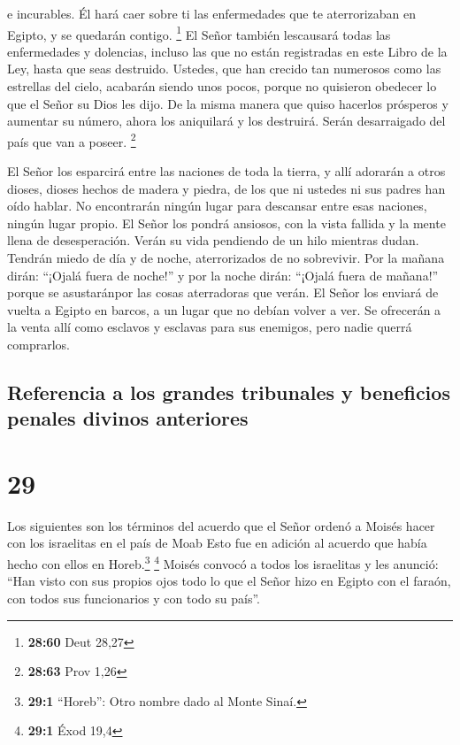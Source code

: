 e incurables.  Él hará caer sobre ti las enfermedades que
te aterrorizaban en Egipto, y se quedarán contigo. \footnote{\textbf{28:60}
  Deut 28,27}  El Señor también lescausará todas las
enfermedades y dolencias, incluso las que no están registradas en este
Libro de la Ley, hasta que seas destruido.  Ustedes, que
han crecido tan numerosos como las estrellas del cielo, acabarán siendo
unos pocos, porque no quisieron obedecer lo que el Señor su Dios les
dijo.  De la misma manera que quiso hacerlos prósperos y
aumentar su número, ahora los aniquilará y los destruirá. Serán
desarraigado del país que van a poseer. \footnote{\textbf{28:63} Prov
  1,26}

 El Señor los esparcirá entre las naciones de toda la
tierra, y allí adorarán a otros dioses, dioses hechos de madera y
piedra, de los que ni ustedes ni sus padres han oído hablar.
 No encontrarán ningún lugar para descansar entre esas
naciones, ningún lugar propio. El Señor los pondrá ansiosos, con la
vista fallida y la mente llena de desesperación.  Verán
su vida pendiendo de un hilo mientras dudan. Tendrán miedo de día y de
noche, aterrorizados de no sobrevivir.  Por la mañana
dirán: ``¡Ojalá fuera de noche!'' y por la noche dirán: ``¡Ojalá fuera
de mañana!'' porque se asustaránpor las cosas aterradoras que verán.
 El Señor los enviará de vuelta a Egipto en barcos, a un
lugar que no debían volver a ver. Se ofrecerán a la venta allí como
esclavos y esclavas para sus enemigos, pero nadie querrá comprarlos.

\hypertarget{referencia-a-los-grandes-tribunales-y-beneficios-penales-divinos-anteriores}{%
\subsection{Referencia a los grandes tribunales y beneficios penales
divinos
anteriores}\label{referencia-a-los-grandes-tribunales-y-beneficios-penales-divinos-anteriores}}

\hypertarget{section-28}{%
\section{29}\label{section-28}}

 Los siguientes son los términos del acuerdo que el Señor
ordenó a Moisés hacer con los israelitas en el país de Moab Esto fue en
adición al acuerdo que había hecho con ellos en Horeb.\footnote{\textbf{29:1}
  ``Horeb'': Otro nombre dado al Monte Sinaí.} \footnote{\textbf{29:1}
  Éxod 19,4}  Moisés convocó a todos los israelitas y les
anunció: ``Han visto con sus propios ojos todo lo que el Señor hizo en
Egipto con el faraón, con todos sus funcionarios y con todo su país''.

